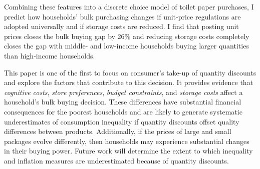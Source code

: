 \documentclass[AER]{AEA_mal}
\begin{document}
Combining these features into a discrete choice model of toilet paper purchases, I predict how households' bulk purchasing changes if unit-price regulations are adopted universally and if storage costs are reduced. I find that posting unit prices closes the bulk buying gap by 26\% and reducing storage costs completely closes the gap with middle- and low-income households buying larger quantities than high-income households.

This paper is one of the first to focus on consumer's take-up of quantity discounts and explore the factors that contribute to this decision. It provides evidence that \textit{cognitive costs}, \textit{store preferences}, \textit{budget constraints}, and \textit{storage costs} affect a household's bulk buying decision. These differences have substantial financial consequences for the poorest households and are likely to generate systematic underestimates of consumption inequality if quantity discounts offset quality differences between products. Additionally, if the prices of large and small packages evolve differently, then households may experience substantial changes in their buying power. Future work will determine the extent to which inequality and inflation measures are underestimated because of quantity discounts.




\newpage
\appendix

%
%
%
%
%   
\end{document}
